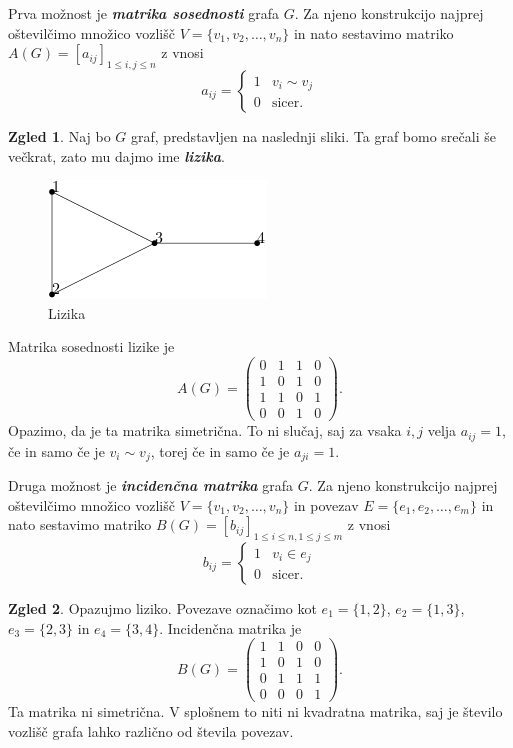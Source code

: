 \documentclass[11pt]{book}
\def\definicija{\color{rdeca}\bf\em}
\theoremstyle{definition}
\theoremstyle{zgled}
\newtheorem*{zgled}{Zgled}
\theoremstyle{odprtproblem}
\theoremstyle{domacanaloga}
\theoremstyle{izrek}
\begin{document}
Prva možnost je {\definicija matrika sosednosti} grafa $G$. Za njeno konstrukcijo najprej oštevilčimo množico vozlišč $V = \{ v_1, v_2, \dots, v_n \}$ in nato sestavimo matriko $A(G) = [a_{ij}]_{1 \leq i,j \leq n}$ z vnosi
\[
    a_{ij} = \begin{cases}
        1 & v_i \sim v_j \\
        0 & \text{sicer.}
    \end{cases}
\]

\begin{zgled}
Naj bo $G$ graf, predstavljen na naslednji sliki. Ta graf bomo srečali še večkrat, zato mu dajmo ime {\definicija lizika}.

\begin{figure}[h]
    \centering
    \includegraphics[width=0.5\linewidth]{img/grafi-std.png}
    \caption{Lizika}
\end{figure}

Matrika sosednosti lizike je 
\[
    A(G) = \begin{pmatrix}
        0 & 1 & 1 & 0 \\
        1 & 0 & 1 & 0 \\
        1 & 1 & 0 & 1 \\
        0 & 0 & 1 & 0
    \end{pmatrix}.
\]
Opazimo, da je ta matrika simetrična. To ni slučaj, saj za vsaka $i,j$ velja $a_{ij} = 1$, če in samo če je $v_i \sim v_j$, torej če in samo če je $a_{ji} = 1$.
\end{zgled}

Druga možnost je {\definicija incidenčna matrika} grafa $G$. Za njeno konstrukcijo najprej oštevilčimo množico vozlišč $V = \{ v_1, v_2, \dots, v_n \}$ in povezav $E = \{ e_1, e_2, \dots, e_m \}$ in nato sestavimo matriko $B(G) = [b_{ij}]_{1 \leq i \leq n, 1 \leq j \leq m}$ z vnosi
\[
    b_{ij} = \begin{cases}
        1 & v_i \in e_j \\
        0 & \text{sicer.}
    \end{cases}
\]

\begin{zgled}
Opazujmo liziko. Povezave označimo kot $e_1 = \{ 1, 2 \}$, $e_2 = \{ 1, 3 \}$, $e_3 = \{ 2, 3 \}$ in $e_4 = \{ 3, 4 \}$. Incidenčna matrika je 
\[
    B(G) =
    \begin{pmatrix}
        1 & 1 & 0 & 0 \\
        1 & 0 & 1 & 0 \\
        0 & 1 & 1 & 1 \\
        0 & 0 & 0 & 1
    \end{pmatrix}.
\]
Ta matrika ni simetrična. V splošnem to niti ni kvadratna matrika, saj je število vozlišč grafa lahko različno od števila povezav.
\end{zgled}
\end{document}

